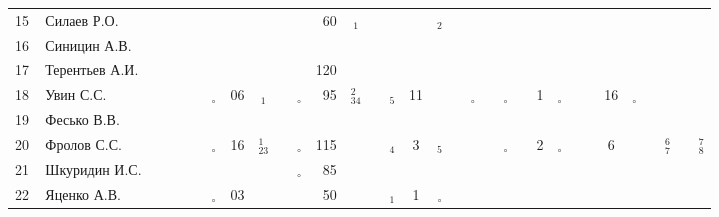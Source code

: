\documentclass[a4paper,landscape,11pt]{article}
\newcommand*\OK{&\small \ding{51}$\!\!_\circ$} %
\newcommand*\Ok{&\small \ding{51}$\!\!_\circ$} %
\newcommand*\ok{&{\small \ding{51}}} %
\newcommand*\no{&{\small }} %
\newcommand*\da{&{\small\ding{48}$\!\!_1$}} %
\newcommand*\ac{&{\small\ding{48}$\!\!^1_{23}$}} %
\newcommand*\db{&{\small\ding{48}$\!\!_2$}} %
\newcommand*\dd{&{\small\ding{48}$\!\!_4$}} %
\newcommand*\bd{&{\small\ding{48}$\!\!^2_{34}$}} %
\newcommand*\de{&{\small\ding{48}$\!\!_5$}} %
\newcommand*\fg{&{\small\ding{48}$\!\!^6_7$}} %
\newcommand*\gh{&{\small\ding{48}$\!\!^7_8$}} %
\begin{document}
\begin{tabular}{p{7pt}|l|p{6pt}p{6pt}cp{6pt}cccccrcccccccccccccccccccc}
15\,&Силаев Р.О.      \ok\ok\no\no\no\no\no\no\ok& 60\da\ok\no \no\db\no\ok\no\no\no\no\no\no\no\no\no\no\no\no\no\\
16\,&Синицин А.В.     \ok\ok\no\ok\no\no\no\no\no \no\no\no\no \no\no\no\no\no\no\no\no\no\no\no\no\no\no\no\no\no\\
17\,&Терентьев А.И.   \ok\ok\ok\ok\no\no\no\no\ok&120\no\no\no \no\no\no\no\no\no\no\no\no\no\no\no\no\no\no\no\no\\
18\,&Увин С.С.        \ok\ok\ok\ok\OK&06\da\ok\OK& 95\bd\ok\de& 11\ok\ok\Ok\ok\Ok\ok& 1\Ok\ok\ok&16\Ok\ok\ok\ok\ok\\
19\,&Фесько В.В.      \no\no\no\no\no\no\no\no\no \no\no\no\no \no\no\no\no\no\no\no\no\no\no\no\no\no\no\no\no\no\\
20\,&Фролов С.С.      \ok\ok\ok\ok\OK&16\ac\ok\OK&115\ok\ok\dd&  3\de\ok\ok\ok\Ok\no& 2\Ok\ok\ok& 6\ok\ok\fg\ok\gh\\ 
21\,&Шкуридин И.С.    \ok\ok\ok\ok\ok\no\ok\ok\OK& 85\ok\ok\no \no\ok\no\no\no\no\ok\no\no\no\no\no\no\no\no\no\no\\
22\,&Яценко А.В.      \ok\ok\ok\ok\OK&03\ok\ok\ok& 50\ok\ok\da&  1\Ok\no\no\no\no\ok\no\no\no\no\no\no\no\no\no\no\\ 
\bottomrule
\end{tabular} 
\newpage
%
\hspace{-6cm}
\end{document}
